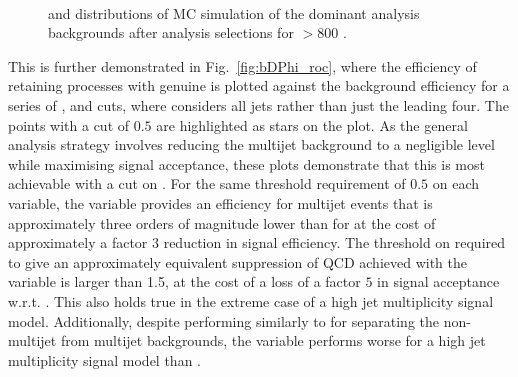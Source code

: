 \begin{figure}[!h]
 \centering
  \\
 \caption{\bdphi and \dphimhtj distributions of MC simulation of the
 dominant analysis backgrounds
 after analysis selections for \scalht $> 800$ \GeV. }
 \label{fig:bDPhi_nominal}
\end{figure}

This is further demonstrated in Fig.~\ref{fig:bDPhi_roc}, where the
efficiency of retaining processes with genuine \mht is plotted against
the background efficiency for a series of \bdphi, \dphimhtj and
\dphimhtjall cuts, where \dphimhtjall considers all jets rather than
just the leading four. The points with a cut of $0.5$ are highlighted
as stars on the plot. As the general analysis strategy involves reducing
the \QCD multijet background to a negligible level while maximising
signal acceptance, these plots demonstrate that this is most
achievable with a cut on \bdphi. For the same threshold requirement of
$0.5$ on each variable, the \bdphi variable provides an efficiency for
multijet events that is approximately three orders of magnitude lower
than for \dphimhtj at the cost of approximately a factor $3$ reduction
in signal efficiency. The threshold on \bdphi required to give an
approximately equivalent suppression of QCD achieved with the
\dphimhtj variable is larger than 1.5, at the cost of a loss of a
factor $5$ in signal acceptance w.r.t. \bdphi. This also holds true in
the extreme case of a high jet multiplicity signal model.
Additionally, despite performing similarly to \bdphi for separating
the non-multijet from multijet backgrounds, the \dphimhtjall variable
performs worse for a high jet multiplicity signal model than \bdphi.

